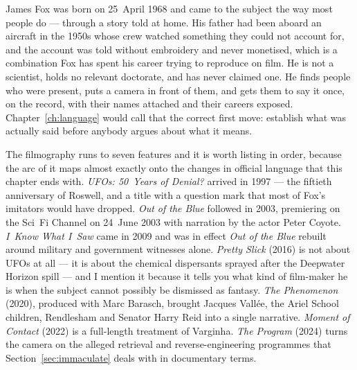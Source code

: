 James Fox was born on 25~April 1968 and came to the subject the way most people do --- through a
story told at home. His father had been aboard an aircraft in the 1950s whose crew watched something
they could not account for, and the account was told without embroidery and never monetised, which
is a combination Fox has spent his career trying to reproduce on film. He is not a scientist, holds
no relevant doctorate, and has never claimed one.  He finds people who were present, puts a camera in front of them, and gets them to
say it once, on the record, with their names attached and their careers exposed. Chapter~\ref{ch:language}
would call that the correct first move: establish what was actually said before anybody argues about
what it means.

The filmography runs to seven features and it is worth listing in order, because the arc of it maps
almost exactly onto the changes in official language that this chapter ends with.
\emph{UFOs: 50~Years of Denial?} arrived in 1997 --- the fiftieth anniversary of Roswell, and a title
with a question mark that most of Fox's imitators would have dropped. \emph{Out of the Blue}
followed in 2003, premiering on the Sci~Fi Channel on 24~June 2003 with narration by the actor Peter
Coyote. \emph{I~Know What I~Saw} came in 2009 and was in effect \emph{Out of the Blue} rebuilt
around military and government witnesses alone. \emph{Pretty Slick} (2016) is not about UFOs at all
--- it is about the chemical dispersants sprayed after the Deepwater Horizon spill --- and I mention
it because it tells you what kind of film-maker he is when the subject cannot possibly be dismissed
as fantasy. \emph{The Phenomenon} (2020), produced with Marc Barasch, brought Jacques
Vall\'ee, the Ariel School children, Rendlesham and Senator Harry Reid into a single
narrative. \emph{Moment of Contact} (2022) is a full-length treatment of Varginha. \emph{The
Program} (2024) turns the camera on the alleged retrieval and reverse-engineering programmes that
Section~\ref{sec:immaculate} deals with in documentary terms.

